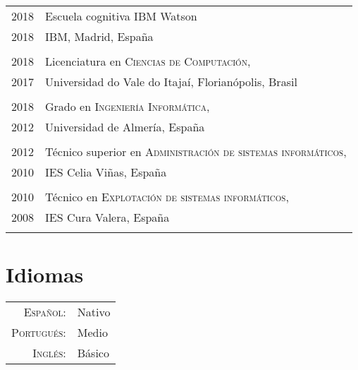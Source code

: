 \documentclass[a4paper,10pt]{article}
\begin{document}
\begin{tabular}{r|p{11cm}}

\textsc {2018} & Escuela cognitiva IBM Watson}, \\\textsc{2018}& IBM, Madrid, España \normalsize \\\multicolumn{2}{c}{} \\


\textsc {2018} & Licenciatura en \textsc{Ciencias de Computación}, \\\textsc{2017}& {Universidad do Vale do Itajaí}, Florianópolis, Brasil \normalsize \\\multicolumn{2}{c}{} \\

\textsc{2018} & Grado en \textsc{Ingeniería Informática}, \\\textsc{2012} &{Universidad de Almería}, España \normalsize \\\multicolumn{2}{c}{} \\

\textsc 2012 & Técnico superior en \textsc{Administración de sistemas informáticos}, \\\textsc{2010} &{IES Celia Viñas}, España \normalsize \\\multicolumn{2}{c}{} \\

\textsc 2010 & Técnico en \textsc{Explotación de sistemas informáticos}, \\\textsc{2008} &{IES Cura Valera}, España \normalsize \\\multicolumn{2}{c}{} \\

\end{tabular}



\section*{Idiomas}
\begin{tabular}{rp{12cm}}
\textsc{Español:} & Nativo \\
\textsc{Portugués:} & Medio \\
\textsc{Inglés:} & Básico \\


\end{tabular}
\end{document}
